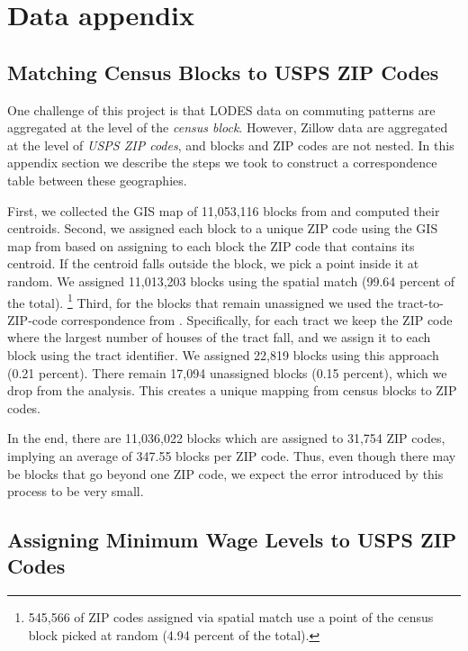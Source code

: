 \clearpage
\section{Data appendix}

\subsection{Matching Census Blocks to USPS ZIP Codes}
\label{sec:blocks_to_uspszip}

One challenge of this project is that LODES data on commuting patterns are 
aggregated at the level of the \textit{census block}.
However, Zillow data are aggregated at the level of \textit{USPS ZIP codes},
and blocks and ZIP codes are not nested.
In this appendix section we describe the steps we took to construct a 
correspondence table between these geographies.

First, we collected the GIS map of 11,053,116 blocks from \textcite{cbTiger} and
computed their centroids.
Second, we assigned each block to a unique ZIP code using the GIS map from 
\textcite{ESRI} based on assigning to each block the ZIP code that contains its 
centroid.
If the centroid falls outside the block, we pick a point inside it at random.
We assigned 11,013,203 blocks using the spatial match (99.64 percent of the 
total).%
\footnote{545,566 of ZIP codes assigned via spatial match use 
a point of the census block picked at random (4.94 percent of the total).}
Third, for the blocks that remain unassigned we used the tract-to-ZIP-code 
correspondence from \textcite{hudCrosswalks}.
Specifically, for each tract we keep the ZIP code where the largest number 
of houses of the tract fall, and we assign it to each block using the tract 
identifier.
We assigned 22,819 blocks using this approach (0.21 percent).
There remain 17,094 unassigned blocks (0.15 percent), which we drop from the 
analysis.
This creates a unique mapping from census blocks to ZIP codes.

In the end, there are 11,036,022 blocks which are assigned to 31,754 ZIP codes, 
implying an average of 347.55 blocks per ZIP code.
Thus, even though there may be blocks that go beyond one ZIP code, we expect 
the error introduced by this process to be very small.

\subsection{Assigning Minimum Wage Levels to USPS ZIP Codes}
\label{sec:assigning_mw_levels}

